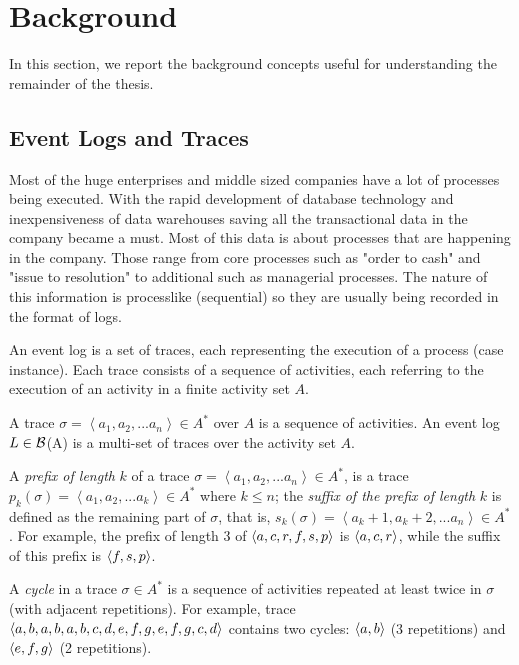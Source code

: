 

\section{Background} %
\label{sec:background}
In this section, we report the background concepts useful for understanding the remainder of the thesis.



\subsection{Event Logs and Traces}

Most of the huge enterprises and middle sized companies have a lot of processes being executed. With the rapid development of database technology and inexpensiveness of data warehouses saving all the transactional data in the company became a must. Most of this data is about processes that are happening in the company. Those range from core processes such as "order to cash" and "issue to resolution" to additional such as managerial processes. The nature of this information is processlike (sequential) so they are usually being recorded in the format of logs. 

An event log is a set of traces, each representing the execution of a process (case instance). Each trace consists of a sequence of activities, each referring to the execution of an activity in a finite activity set $A$.
\begin{definition}
	A trace $\sigma=\left\langle a_1, a_2, ... a_n\right\rangle \in A^*$ over $A$ is a sequence of activities. An event log $L \in \cal{B}$(A) is a multi-set of traces over the activity set $A$.
\end{definition}

A \emph{prefix of length} $k$ of a trace $\sigma=\left\langle a_1, a_2, ... a_n\right\rangle \in A^*$, is a trace $p_k(\sigma)=\left\langle a_1, a_2, ... a_k\right\rangle \in A^*$ where $k \leq n$; the \emph{suffix of the prefix of length} $k$ is defined as the remaining part of $\sigma$, that is, $s_k(\sigma) = \left\langle a_k+1, a_k+2, ... a_n\right\rangle \in A^*$. For example, the prefix of length $3$ of $\langle a,c,r,f,s,p\rangle$ is $\langle a,c,r\rangle$, while the suffix of this prefix is $\langle f,s,p\rangle$.

A \emph{cycle} in a trace $\sigma \in A^*$ is a sequence of activities repeated at least twice in $\sigma$ (with adjacent repetitions). For example, trace $\langle a,b,a,b,a,b,c,d,e,f,g,e,f,g,c,d\rangle$ contains two cycles: $\langle a,b\rangle$ (3 repetitions) and $\langle e,f,g\rangle$ (2 repetitions).


